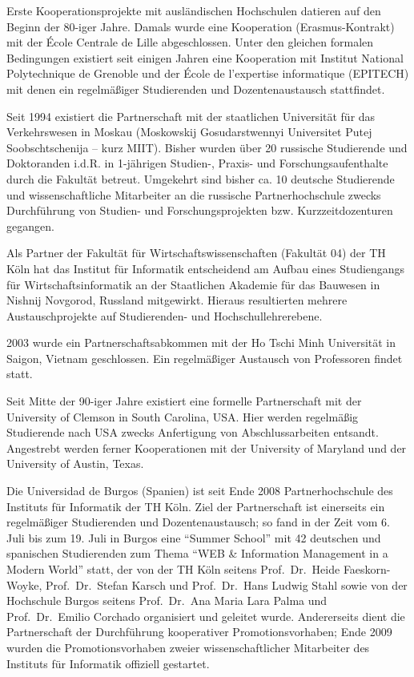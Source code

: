 Erste Kooperationsprojekte mit ausländischen Hochschulen datieren auf
den Beginn der 80-iger Jahre. Damals wurde eine Kooperation
(Erasmus-Kontrakt) mit der École Centrale de Lille abgeschlossen. Unter
den gleichen formalen Bedingungen existiert seit einigen Jahren eine
Kooperation mit Institut National Polytechnique de Grenoble und der
École de l'expertise informatique (EPITECH) mit denen ein regelmäßiger
Studierenden und Dozentenaustausch stattfindet.

Seit 1994 existiert die Partnerschaft mit der staatlichen Universität
für das Verkehrswesen in Moskau (Moskowskij Gosudarstwennyi Universitet
Putej Soobschtschenija -- kurz MIIT). Bisher wurden über 20 russische
Studierende und Doktoranden i.d.R. in 1-jährigen Studien-, Praxis- und
Forschungsaufenthalte durch die Fakultät betreut. Umgekehrt sind bisher
ca. 10 deutsche Studierende und wissenschaftliche Mitarbeiter an die
russische Partnerhochschule zwecks Durchführung von Studien- und
Forschungsprojekten bzw. Kurzzeitdozenturen gegangen.

Als Partner der Fakultät für Wirtschaftswissenschaften (Fakultät 04) der
TH Köln hat das Institut für Informatik entscheidend am Aufbau eines
Studiengangs für Wirtschaftsinformatik an der Staatlichen Akademie für
das Bauwesen in Nishnij Novgorod, Russland mitgewirkt. Hieraus
resultierten mehrere Austauschprojekte auf Studierenden- und
Hochschullehrerebene.

2003 wurde ein Partnerschaftsabkommen mit der Ho Tschi Minh Universität
in Saigon, Vietnam geschlossen. Ein regelmäßiger Austausch von
Professoren findet statt.

Seit Mitte der 90-iger Jahre existiert eine formelle Partnerschaft mit
der University of Clemson in South Carolina, USA. Hier werden regelmäßig
Studierende nach USA zwecks Anfertigung von Abschlussarbeiten entsandt.
Angestrebt werden ferner Kooperationen mit der University of Maryland
und der University of Austin, Texas.

Die Universidad de Burgos (Spanien) ist seit Ende 2008 Partnerhochschule
des Instituts für Informatik der TH Köln. Ziel der Partnerschaft ist
einerseits ein regelmäßiger Studierenden und Dozentenaustausch; so fand
in der Zeit vom 6. Juli bis zum 19. Juli in Burgos eine ``Summer
School'' mit 42 deutschen und spanischen Studierenden zum Thema ``WEB \&
Information Management in a Modern World'' statt, der von der TH Köln
seitens Prof.~Dr.~Heide Faeskorn-Woyke, Prof.~Dr.~Stefan Karsch und
Prof.~Dr.~Hans Ludwig Stahl sowie von der Hochschule Burgos seitens
Prof.~Dr.~Ana Maria Lara Palma und Prof.~Dr.~Emilio Corchado organisiert
und geleitet wurde. Andererseits dient die Partnerschaft der
Durchführung kooperativer Promotionsvorhaben; Ende 2009 wurden die
Promotionsvorhaben zweier wissenschaftlicher Mitarbeiter des Instituts
für Informatik offiziell gestartet.

